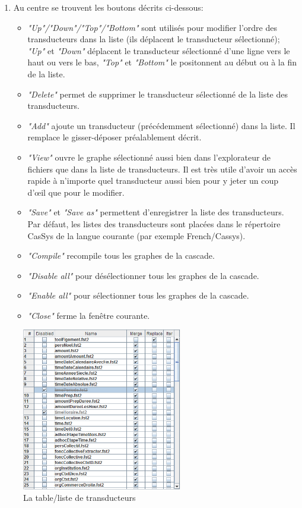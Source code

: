 \begin{enumerate}
	 \item Au centre se trouvent les boutons décrits ci-dessous:
		\begin{itemize}
		\item \textit{"Up"/"Down"/"Top"/"Bottom"} sont utilisés pour modifier l'ordre
		des transducteurs dans la liste (ils déplacent le transducteur sélectionné); 
		\textit{"Up"} et \textit{"Down"} déplacent le transducteur sélectionné d'une ligne vers le haut ou
			vers le bas, \textit{"Top"} et \textit{"Bottom"} le positonnent au début ou à la fin de la liste.
		\item \textit{"Delete"} permet de supprimer le transducteur sélectionné de
		la liste des transducteurs. 
		\item \textit{"Add"} ajoute un transducteur (précédemment sélectionné) dans la liste.
			Il remplace le gisser-déposer préalablement décrit.
		\item \textit{"View"} ouvre le graphe sélectionné aussi bien dans l'explorateur
		de fichiers que dans la liste de transducteurs. Il est très utile d'avoir un accès
		rapide à n'importe quel transducteur aussi bien pour y jeter un coup d'œil que pour
		le modifier.
		\item \textit{"Save"} et \textit{"Save as"} permettent d'enregistrer la
		liste des transducteurs. Par défaut, les listes des transducteurs sont placées dans
		le répertoire CasSys de la langue courante  (par exemple French/Cassys).
		\item \textit{"Compile"} recompile tous les graphes de la cascade.	
		\item \textit{"Disable all"} pour désélectionner tous les graphes de la cascade.	
		\item \textit{"Enable all"} pour sélectionner tous les graphes de la cascade.	
		\item \textit{"Close"} ferme la fenêtre courante.
		\end{itemize}
\end{enumerate}


\begin{figure}[!htb]
  \centering
  \includegraphics[width=7cm]{resources/img/fig13-09.png}
  \caption{La table/liste de transducteurs}
  \label{fig13-09}
\end{figure}

